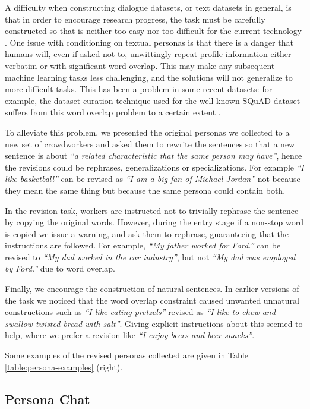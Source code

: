 A difficulty when constructing dialogue datasets, or text datasets in general, is that in order to
encourage research progress, the task must be carefully constructed so that is neither too
 easy nor too difficult for the current technology 
 \citep{voorhees1999trec}.
One issue with conditioning on textual personas is that there is a danger that humans will, even if asked not to,
unwittingly repeat profile information either verbatim or with significant word overlap.
This may make any subsequent machine learning tasks less challenging, and the solutions will not generalize to
more difficult tasks. This has been a problem in some recent datasets:
for example, the dataset curation technique used for the well-known SQuAD dataset
suffers from this word overlap problem to a certain extent \citep{chen2017reading}.

To alleviate this problem, we presented the original personas we collected to a new set of crowdworkers
and asked them to rewrite the sentences so that a new sentence is about 
{\em ``a related characteristic that the same person may have''},
hence the revisions could be rephrases, generalizations or specializations.
For example {\em ``I like basketball''} can be revised as {\em ``I am a big fan of Michael Jordan''}
not because they mean the same thing but because the same persona could contain both. 

In the revision task, workers are instructed not to trivially rephrase the sentence by copying the original words.
However, during the entry stage if a non-stop word is copied we issue a
warning, and ask them to rephrase, guaranteeing that the instructions are followed. 
For example, {\em ``My father worked for Ford.''} can be revised to
{\em ``My dad worked in the car industry''}, but not
{\em ``My dad was employed by Ford.''} due to word overlap.

\ifarxiv
Finally, we encourage the construction of  natural sentences. In earlier versions of the task we noticed that
the word overlap constraint caused unwanted unnatural constructions such as {\em ``I like eating pretzels''} revised as
{\em ``I like to chew and swallow twisted bread with salt''}. Giving explicit instructions about this seemed to help,
where we prefer a revision like {\em ``I enjoy beers and beer snacks''}.
\fi

Some examples of the revised personas collected are given in Table \ref{table:persona-examples} (right).


\subsection{Persona Chat}\label{personachatter}

